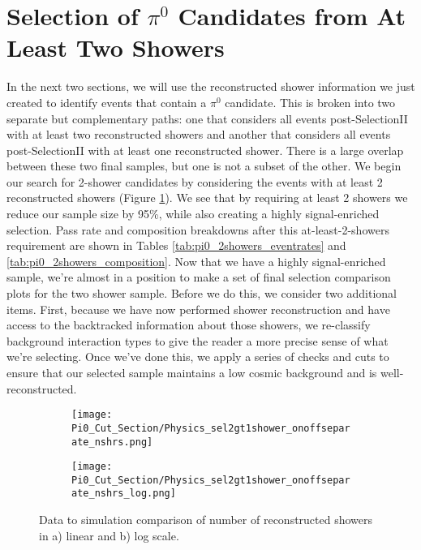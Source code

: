 \documentclass{article}
\begin{document}
\clearpage
\section{Selection of $\pi^0$ Candidates from At Least Two Showers}

In the next two sections, we will use the reconstructed shower information we just created to identify events that contain a $\pi^0$ candidate. This is broken into two separate but complementary paths: one that considers all events post-SelectionII with at least two reconstructed showers and another that considers all events post-SelectionII with at least one reconstructed shower. There is a large overlap between these two final samples, but one is not a subset of the other.  
We begin our search for 2-shower candidates by considering the events with at least 2 reconstructed showers (Figure \ref{fig:physics_pi0_nshrs}).  We see that by requiring at least 2 showers we reduce our sample size by 95\%, while also creating a highly signal-enriched selection. Pass rate and composition breakdowns after this at-least-2-showers requirement are shown in Tables \ref{tab:pi0_2showers_eventrates} and \ref{tab:pi0_2showers_composition}. 
Now that we have a highly signal-enriched sample, we're almost in a position to make a set of final selection comparison plots for the two shower sample.  Before we do this, we consider two additional items. First, because we have now performed shower reconstruction and have access to the backtracked information about those showers, we re-classify background interaction types to give the reader a more precise sense of what we're selecting. Once we've done this, we apply a series of checks and cuts to ensure that our selected sample maintains a low cosmic background and is well-reconstructed.

\begin{figure}[H]
\centering
  \begin{subfigure}[t]{0.3\textwidth}
    \centering
\texttt{[image: Pi0\_Cut\_Section/Physics\_sel2gt1shower\_onoffseparate\_nshrs.png]}
  \caption{ }
  \end{subfigure} 
  \hspace{30mm}
  \begin{subfigure}[t]{0.3\textwidth}
    \centering
    \texttt{[image: Pi0\_Cut\_Section/Physics\_sel2gt1shower\_onoffseparate\_nshrs\_log.png]}
  \caption{ }
  \end{subfigure} 
\caption{ Data to simulation comparison of number of reconstructed showers in a) linear and b) log scale. }
\label{fig:physics_pi0_nshrs}
\end{figure}
\end{document}
